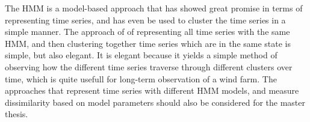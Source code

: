 The HMM is a model-based approach that has showed great promise in terms of representing time series, and has even be used to cluster the time series \cite{hmm_pm10_quantifying_impacts} in a simple manner.
The approach of \textcite{hmm_pm10_quantifying_impacts} of representing all time series with the same HMM, and then clustering together time series which are in the same state is simple, but also elegant.
It is elegant because it yields a simple method of observing how the different time series traverse through different clusters over time, which is quite usefull for long-term observation of a wind farm. 
The approaches that represent time series with different HMM models, and measure dissimilarity based on model parameters \cite{} should also be considered for the master thesis.


